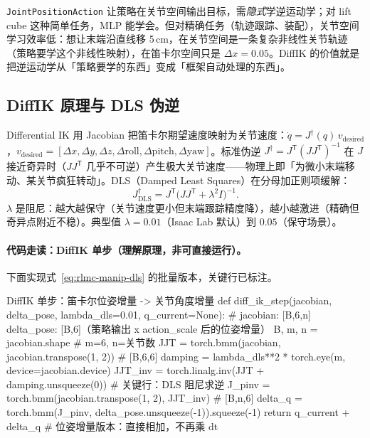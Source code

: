 \verb|JointPositionAction| 让策略在关节空间输出目标，需\emph{隐式}学逆运动学；对 lift cube 这种简单任务，MLP 能学会。但对精确任务（轨迹跟踪、装配），关节空间学习效率低：想让末端沿直线移 5\,cm，在关节空间是一条复杂非线性关节轨迹（策略要学这个非线性映射），在笛卡尔空间只是 $\Delta x=0.05$。DiffIK 的价值就是把逆运动学从「策略要学的东西」变成「框架自动处理的东西」。

\subsection{DiffIK 原理与 DLS 伪逆}
\label{sec:rlmc-diffik-manip}

Differential IK 用 Jacobian 把笛卡尔期望速度映射为关节速度：$\dot q = J^\dagger(q)\,v_{\text{desired}}$，$v_{\text{desired}}=[\Delta x,\Delta y,\Delta z,\Delta\mathrm{roll},\Delta\mathrm{pitch},\Delta\mathrm{yaw}]$。标准伪逆 $J^\dagger=J^{\mathsf T}(JJ^{\mathsf T})^{-1}$ 在 $J$ 接近奇异时（$JJ^{\mathsf T}$ 几乎不可逆）产生极大关节速度——物理上即「为微小末端移动、某关节疯狂转动」。DLS（Damped Least Squares）在分母加正则项缓解：
\begin{equation}
J^\dagger_{\text{DLS}} = J^{\mathsf T}\bigl(JJ^{\mathsf T} + \lambda^2 I\bigr)^{-1}.
\label{eq:rlmc-manip-dls}
\end{equation}
$\lambda$ 是阻尼：越大越保守（关节速度更小但末端跟踪精度降），越小越激进（精确但奇异点附近不稳）。典型值 $\lambda=0.01$（Isaac Lab 默认）到 $0.05$（保守场景）。

\paragraph{代码走读：DiffIK 单步（理解原理，非可直接运行）。}下面实现式~\eqref{eq:rlmc-manip-dls} 的批量版本，关键行已标注。

\begin{codebox}[Python]{DiffIK 单步：笛卡尔位姿增量 -> 关节角度增量}
def diff_ik_step(jacobian, delta_pose, lambda_dls=0.01, q_current=None):
    # jacobian: [B,6,n]  delta_pose: [B,6]（策略输出 x action_scale 后的位姿增量）
    B, m, n = jacobian.shape                       # m=6, n=关节数
    JJT = torch.bmm(jacobian, jacobian.transpose(1, 2))          # [B,6,6]
    damping = lambda_dls**2 * torch.eye(m, device=jacobian.device)
    JJT_inv = torch.linalg.inv(JJT + damping.unsqueeze(0))       # 关键行：DLS 阻尼求逆
    J_pinv = torch.bmm(jacobian.transpose(1, 2), JJT_inv)        # [B,n,6]
    delta_q = torch.bmm(J_pinv, delta_pose.unsqueeze(-1)).squeeze(-1)
    return q_current + delta_q   # 位姿增量版本：直接相加，不再乘 dt
\end{codebox}

